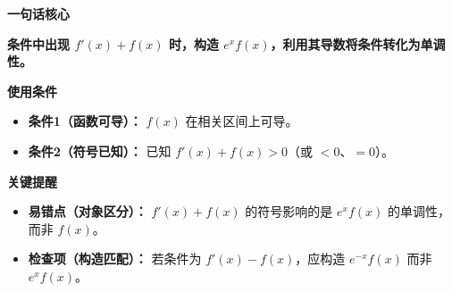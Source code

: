 \begin{summarybox}
	\textbf{\textcolor{CSummary}{一句话核心}}

	\textbf{条件中出现 $f'(x)+f(x)$ 时，构造 $e^x f(x)$，利用其导数将条件转化为单调性。}

	\medskip
	\textbf{\textcolor{CSummary}{使用条件}}
	\begin{itemize}[leftmargin=*, itemsep=0.5em, topsep=0.4em]
		\item \textbf{条件1（函数可导）：} $f(x)$ 在相关区间上可导。
		\item \textbf{条件2（符号已知）：} 已知 $f'(x)+f(x) > 0$（或 $<0$、$=0$）。
	\end{itemize}

	\medskip
	\textbf{\textcolor{CSummary}{关键提醒}}
	\begin{itemize}[leftmargin=*, itemsep=0.5em, topsep=0.4em]
		\item \textbf{易错点（对象区分）：} $f'(x)+f(x)$ 的符号影响的是 $e^x f(x)$ 的单调性，而非 $f(x)$。
		\item \textbf{检查项（构造匹配）：} 若条件为 $f'(x)-f(x)$，应构造 $e^{-x}f(x)$ 而非 $e^x f(x)$。
	\end{itemize}
\end{summarybox}

